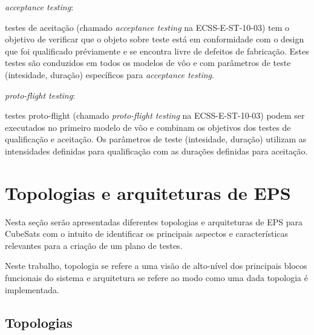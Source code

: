 \begin{alineas}
    \item \textit{acceptance testing}:
    \begin{alineas}
        \item testes de aceitação (chamado \textit{acceptance testing} na ECSS-E-ST-10-03) tem o objetivo de verificar que o objeto sobre teste está em conformidade com o design que foi qualificado préviamente e se encontra livre de defeitos de fabricação. Estes testes são conduzidos em todos os modelos de vôo e com parâmetros de teste (intesidade, duração) específicos para \textit{acceptance testing}.
    \end{alineas}

    \item \textit{proto-flight testing}:
    \begin{alineas}
        \item testes proto-flight (chamado \textit{proto-flight testing} na ECSS-E-ST-10-03) podem ser executados no primeiro modelo de vôo e combinam os objetivos dos testes de qualificação e aceitação. Os parâmetros de teste (intesidade, duração) utilizam as intensidades definidas para qualificação com as durações definidas para aceitação.
    \end{alineas}
\end{alineas}



\section{Topologias e arquiteturas de EPS}\label{sec:arq-top}

Nesta seção serão apresentadas diferentes topologias e arquiteturas de \gls{EPS} para CubeSats com o intuito de identificar os principais aspectos e características relevantes para a criação de um plano de testes.

Neste trabalho, topologia se refere a uma visão de alto-nível dos principais blocos funcionais do sistema e arquitetura se refere ao modo como uma dada topologia é implementada.

\subsection{Topologias}\label{sec:topologias}

